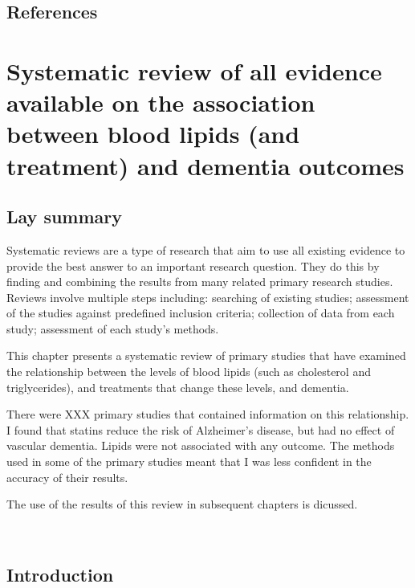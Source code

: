 \documentclass[a4paper, twoside]{templates/ociamthesis}
\begin{document}
\newpage

\hypertarget{references-1}{%
\section{References}\label{references-1}}



\hypertarget{sys-rev-heading}{%
\chapter{Systematic review of all evidence available on the association between blood lipids (and treatment) and dementia outcomes}\label{sys-rev-heading}}

\minitoc 

\hypertarget{lay-summary-2}{%
\section{Lay summary}\label{lay-summary-2}}

Systematic reviews are a type of research that aim to use all existing evidence to provide the best answer to an important research question. They do this by finding and combining the results from many related primary research studies. Reviews involve multiple steps including: searching of existing studies; assessment of the studies against predefined inclusion criteria; collection of data from each study; assessment of each study's methods.

This chapter presents a systematic review of primary studies that have examined the relationship between the levels of blood lipids (such as cholesterol and triglycerides), and treatments that change these levels, and dementia.

There were XXX primary studies that contained information on this relationship. I found that statins reduce the risk of Alzheimer's disease, but had no effect of vascular dementia. Lipids were not associated with any outcome. The methods used in some of the primary studies meant that I was less confident in the accuracy of their results.

The use of the results of this review in subsequent chapters is dicussed.

~

\hypertarget{sys-rev-intro}{%
\section{Introduction}\label{sys-rev-intro}}
\end{document}
